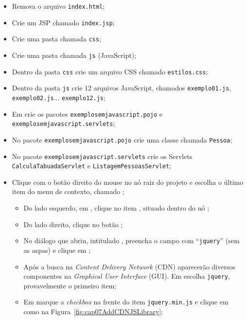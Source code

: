 \begin{itemize}
    \item Remova o arquivo \texttt{index.html};
    \item Crie um JSP chamado \texttt{index.jsp};
    \item Crie uma pasta chamada \texttt{css};
    \item Crie uma pasta chamada \texttt{js} (JavaScript);
    \item Dentro da pasta \texttt{css} crie um arquivo CSS chamado \texttt{estilos.css};
    \item Dentro da pasta \texttt{js} crie 12 arquivos JavaScript, chamados \texttt{exemplo01.js}, \texttt{exemplo02.js}... \texttt{exemplo12.js};
    \item Em  crie os pacotes \texttt{exemplosemjavascript.pojo} e\newline%
    \texttt{exemplosemjavascript.servlets};
    \item No pacote \texttt{exemplosemjavascript.pojo} crie uma classe chamada \texttt{Pessoa};
    \item No pacote \texttt{exemplosemjavascript.servlets} crie os Servlets \texttt{CalculaTabuadaServlet} e \texttt{ListagemPessoasServlet};
    \item Clique com o botão direito do mouse no nó raiz do projeto e escolha o último item do menu de contexto, chamado ;
    \begin{itemize}
        \item Do lado esquerdo, em , clique no item , situado dentro do nó ;
        \item Do lado direito, clique no botão ;
        \item No diálogo que abriu, intitulado , preencha o campo  com ``\texttt{jquery}'' (sem as aspas) e clique em ;
        \item Após a busca na \textit{Content Delivery Network} (CDN) aparecerão diversos componentes na \textit{Graphical User Interface} (GUI). Em  escolha \texttt{jquery}, provavelmente o primeiro item;
        \item Em  marque a \textit{checkbox} na frente do item \texttt{jquery.min.js} e clique em  como na Figura~\ref{fig:cap07AddCDNJSLibrary};

\end{itemize}
\end{itemize}
